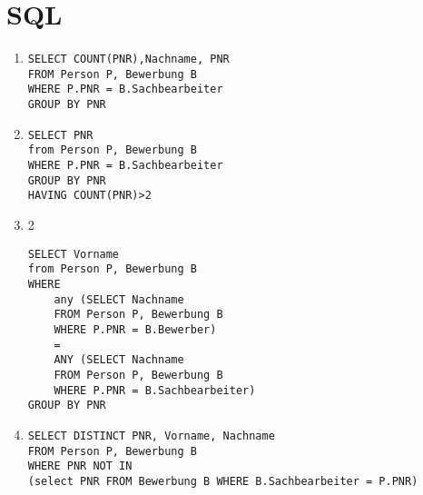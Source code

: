\documentclass[ngerman]{gdb-aufgabenblatt}
\begin{document}
\section{SQL}
\begin{enumerate}
\item
\begin{verbatim}
SELECT COUNT(PNR),Nachname, PNR 
FROM Person P, Bewerbung B
WHERE P.PNR = B.Sachbearbeiter
GROUP BY PNR
\end{verbatim}
\item
\begin{verbatim}
SELECT PNR 
from Person P, Bewerbung B
WHERE P.PNR = B.Sachbearbeiter
GROUP BY PNR
HAVING COUNT(PNR)>2
\end{verbatim}
\item2
\begin{verbatim}
SELECT Vorname
from Person P, Bewerbung B
WHERE 
	any (SELECT Nachname 
	FROM Person P, Bewerbung B
    WHERE P.PNR = B.Bewerber)
    =
    ANY (SELECT Nachname 
	FROM Person P, Bewerbung B
    WHERE P.PNR = B.Sachbearbeiter)
GROUP BY PNR
\end{verbatim}
\item
\begin{verbatim}
SELECT DISTINCT PNR, Vorname, Nachname
FROM Person P, Bewerbung B
WHERE PNR NOT IN 
(select PNR FROM Bewerbung B WHERE B.Sachbearbeiter = P.PNR)
\end{verbatim}
\end{enumerate}
\end{document}
